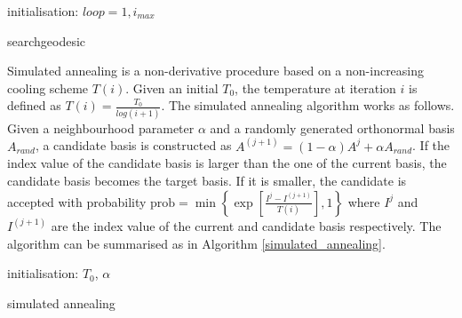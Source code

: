 \documentclass[12pt]{article}
\begin{document}
\newpage
\begin{algorithm}[H]
\SetAlgoLined
  initialisation: $loop = 1, i_{max}$\;
  \caption{searchgeodesic}
  \label{search_geodesic}
\end{algorithm}

Simulated annealing
\citep[\citet{kirkpatrick1983optimization}]{bertsimas1993simulated} is a
non-derivative procedure based on a non-increasing cooling scheme
\(T(i)\). Given an initial \(T_0\), the temperature at iteration \(i\)
is defined as \(T(i) = \frac{T_0}{log(i + 1)}\). The simulated annealing
algorithm works as follows. Given a neighbourhood parameter \(\alpha\)
and a randomly generated orthonormal basis \(A_{rand}\), a candidate
basis is constructed as
\(A^{(j+1)} = (1 - \alpha)A^{j} + \alpha A_{rand}\). If the index value
of the candidate basis is larger than the one of the current basis, the
candidate basis becomes the target basis. If it is smaller, the
candidate is accepted with probability
\(\text{prob} = \min\left\{\exp\left[\frac{I^j - I^{(j+1)}}{T(i)}\right],1\right\}\)
where \(I^j\) and \(I^{(j+1)}\) are the index value of the current and
candidate basis respectively. The algorithm can be summarised as in
Algorithm \ref{simulated_annealing}.

\newpage
\begin{algorithm}[H]
\SetAlgoLined
  initialisation: $T_0$, $\alpha$\;
  \caption{simulated annealing}
  \label{simulated_annealing}
\end{algorithm}
\end{document}
